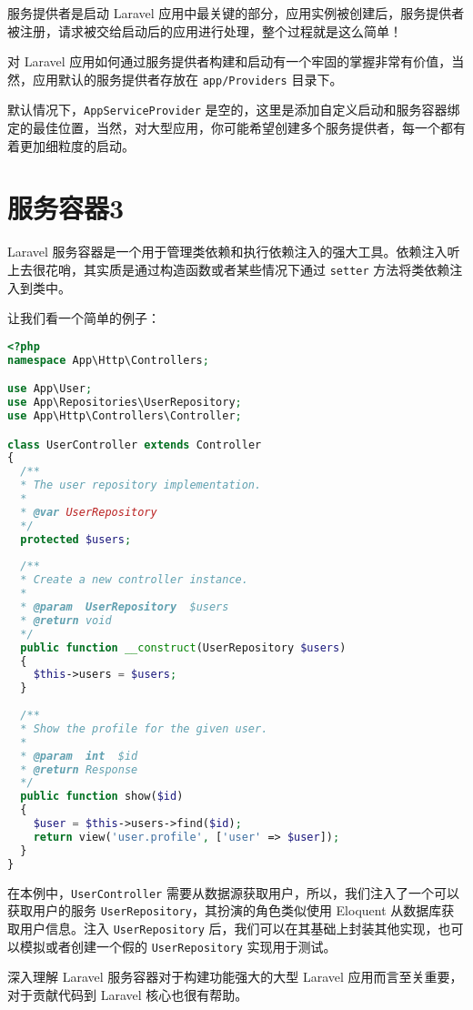 \documentclass{progartcn}
\begin{document}
服务提供者是启动 Laravel 应用中最关键的部分，应用实例被创建后，服务提供者被注册，请求被交给启动后的应用进行处理，整个过程就是这么简单！

对 Laravel 应用如何通过服务提供者构建和启动有一个牢固的掌握非常有价值，当然，应用默认的服务提供者存放在 \verb|app/Providers| 目录下。

默认情况下，\verb|AppServiceProvider| 是空的，这里是添加自定义启动和服务容器绑定的最佳位置，当然，对大型应用，你可能希望创建多个服务提供者，每一个都有着更加细粒度的启动。

\section{服务容器3}

Laravel 服务容器是一个用于管理类依赖和执行依赖注入的强大工具。依赖注入听上去很花哨，其实质是通过构造函数或者某些情况下通过 \verb|setter| 方法将类依赖注入到类中。

让我们看一个简单的例子：

\begin{lstlisting}[language=PHP,caption={PHP 代码样例}]
<?php
namespace App\Http\Controllers;

use App\User;
use App\Repositories\UserRepository;
use App\Http\Controllers\Controller;

class UserController extends Controller
{
  /**
  * The user repository implementation.
  *
  * @var UserRepository
  */
  protected $users;
  
  /**
  * Create a new controller instance.
  * 
  * @param  UserRepository  $users
  * @return void
  */
  public function __construct(UserRepository $users)
  {
    $this->users = $users;
  }
  
  /**
  * Show the profile for the given user.
  *
  * @param  int  $id
  * @return Response
  */
  public function show($id)
  {
    $user = $this->users->find($id);
    return view('user.profile', ['user' => $user]);
  }
}
\end{lstlisting}

在本例中，\verb|UserController| 需要从数据源获取用户，所以，我们注入了一个可以获取用户的服务 \verb|UserRepository|，其扮演的角色类似使用 Eloquent 从数据库获取用户信息。注入 \verb|UserRepository| 后，我们可以在其基础上封装其他实现，也可以模拟或者创建一个假的 \verb|UserRepository| 实现用于测试。

深入理解 Laravel 服务容器对于构建功能强大的大型 Laravel 应用而言至关重要，对于贡献代码到 Laravel 核心也很有帮助。

\end{document}
